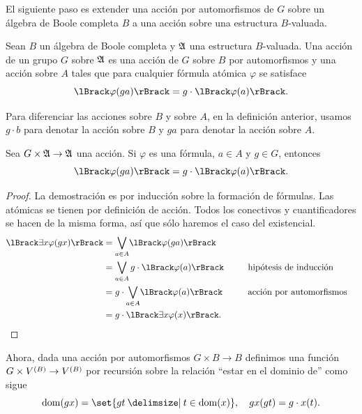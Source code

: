 \documentclass[letterpaper,DIV=15,12pt]{scrartcl}
\DeclarePairedDelimiter{\vb}{\lBrack}{\rBrack}             %
\DeclareMathOperator{\dom}{dom}                            %
\newcommand{\st}{}
\newcommand{\SetSymbol}[1][]{%
\nonscript\:#1\vert
\allowbreak
\nonscript\:
\mathopen{}}
\renewcommand\st{\SetSymbol[\delimsize]}
\begin{document}
El siguiente paso es extender una acción por automorfismos de \(G\) sobre un
álgebra de Boole completa \(B\) a una acción sobre una estructura \(B\)-valuada.

\begin{definition}[label=def:aest]
    Sean \(B\) un álgebra de Boole completa y \(\mathfrak{A}\) una estructura
    \(B\)-valuada. Una acción de un grupo \(G\) sobre \(\mathfrak{A}\) es una acción
    de \(G\) sobre \(B\) por automorfismos y una acción sobre \(A\) tales que
    para cualquier fórmula atómica \(\varphi\) se satisface
    \begin{equation*}
        \vb{\varphi(ga)}=g\cdot\vb{\varphi(a)}.
    \end{equation*}
\end{definition}

Para diferenciar las acciones sobre \(B\) y sobre \(A\), en la definición
anterior, usamos \(g\cdot b\) para denotar la acción sobre \(B\) y \(ga\) para
denotar la acción sobre \(A\).

\begin{proposition}[label=prop:afor]
    Sea \(G\times\mathfrak{A}\to\mathfrak{A}\) una acción.
    Si \(\varphi\) es una fórmula, \(a\in A\) y \(g\in G\), entonces
    \begin{equation*}
        \vb{\varphi(ga)}=g\cdot\vb{\varphi(a)}.
    \end{equation*}
\end{proposition}
\begin{proof}
    La demostración es por inducción sobre la formación de fórmulas.
    Las atómicas se tienen por definición de acción. Todos los conectivos y
    cuantificadores se hacen de la misma forma, así que sólo haremos el caso del
    existencial.
    \begin{align*}
        \vb{\exists x\varphi(gx)} &= \bigvee_{a\in A}\vb{\varphi(ga)}\\
        &= \bigvee_{a\in A}g\cdot\vb{\varphi(a)} && \text{hipótesis de inducción}\\
        &=g\cdot\bigvee_{a\in A}\vb{\varphi(a)} && \text{acción por automorfismos}\\
        &=g\cdot\vb{\exists x\varphi(x)}. \tag*{\qedhere}
    \end{align*}
\end{proof}

Ahora, dada una acción por automorfismos \(G\times B\to B\) definimos una
función \(G\times\mb\to\mb\) por recursión sobre la relación \enquote{estar en
el dominio de} como sigue
\begin{equation*}
    \dom(gx)=\set{gt\st t\in\dom(x)}, \quad gx(gt)=g\cdot x(t).
\end{equation*}
\end{document}
